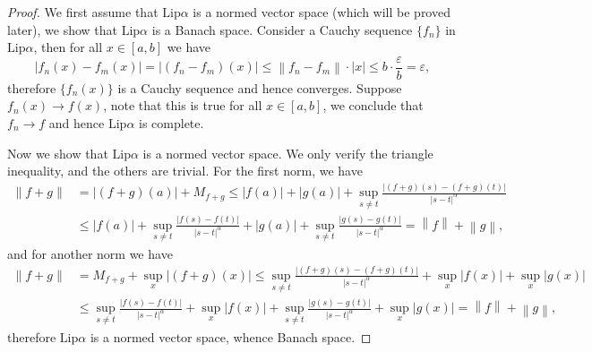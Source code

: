 \begin{proof}
We first assume that $\mathrm{Lip}\alpha$ is a normed vector space (which will be proved later), we show that $\mathrm{Lip}\alpha$ is a Banach space. Consider a Cauchy sequence $\{f_n\}$ in $\mathrm{Lip}\alpha$, then for all $x\in[a,b]$ we have 
$$
\left| f_n\left( x \right) -f_m\left( x \right) \right|=\left| \left( f_n-f_m \right) \left( x \right) \right|\le \left\| f_n-f_m \right\| \cdot \left| x \right|\le b\cdot \frac{\varepsilon}{b}=\varepsilon ,
$$
therefore $\{f_n(x)\}$ is a Cauchy sequence and hence converges. Suppose $f_n(x)\to f(x)$, note that this is true for all $x\in[a,b]$, we conclude that $f_n\to f$ and hence $\mathrm{Lip}\alpha$ is complete.\par
Now we show that $\mathrm{Lip}\alpha$ is a normed vector space. We only verify the triangle inequality, and the others are trivial. For the first norm, we have 
$$
\begin{aligned}
\left\| f+g \right\| &=\left| \left( f+g \right) \left( a \right) \right|+M_{f+g}\le \left| f\left( a \right) \right|+\left| g\left( a \right) \right|+\mathop {\mathrm{sup}} \limits_{s\ne t}\frac{\left| \left( f+g \right) \left( s \right) -\left( f+g \right) \left( t \right) \right|}{\left| s-t \right|^{\alpha}}
\\
&\le \left| f\left( a \right) \right|+\mathop {\mathrm{sup}} \limits_{s\ne t}\frac{\left| f\left( s \right) -f\left( t \right) \right|}{\left| s-t \right|^{\alpha}}+\left| g\left( a \right) \right|+\mathop {\mathrm{sup}} \limits_{s\ne t}\frac{\left| g\left( s \right) -g\left( t \right) \right|}{\left| s-t \right|^{\alpha}}=\left\| f \right\| +\left\| g \right\| ,
\end{aligned}
$$
and for another norm we have 
$$
\begin{aligned}
\left\| f+g \right\| &=M_{f+g}+\mathop {\mathrm{sup}} \limits_{x}\left| \left( f+g \right) \left( x \right) \right|\le \mathop {\mathrm{sup}} \limits_{s\ne t}\frac{\left| \left( f+g \right) \left( s \right) -\left( f+g \right) \left( t \right) \right|}{\left| s-t \right|^{\alpha}}+\mathop {\mathrm{sup}} \limits_{x}\left| f\left( x \right) \right|+\mathop {\mathrm{sup}} \limits_{x}\left| g\left( x \right) \right|
\\
&\le \mathop {\mathrm{sup}} \limits_{s\ne t}\frac{\left| f\left( s \right) -f\left( t \right) \right|}{\left| s-t \right|^{\alpha}}+\mathop {\mathrm{sup}} \limits_{x}\left| f\left( x \right) \right|+\mathop {\mathrm{sup}} \limits_{s\ne t}\frac{\left| g\left( s \right) -g\left( t \right) \right|}{\left| s-t \right|^{\alpha}}+\mathop {\mathrm{sup}} \limits_{x}\left| g\left( x \right) \right|=\left\| f \right\| +\left\| g \right\| ,
\end{aligned}
$$
therefore $\mathrm{Lip}\alpha$ is a normed vector space, whence Banach space. 
\end{proof}
